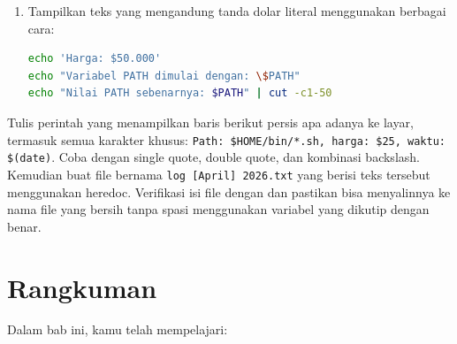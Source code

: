\begin{enumerate}
\begin{lstlisting}[language=bash, caption={Variabel untuk path dengan spasi}]
mkdir -p ~/lab-os/week07-bash/arsip
cp "$FILE_LAMA" "$FILE_BARU"
ls -lah ~/lab-os/week07-bash/arsip/
\end{lstlisting}
    \textit{Amati:} kutipan ganda pada \texttt{"\$FILE\_LAMA"} memastikan
    path yang mengandung spasi diperlakukan sebagai satu argumen, bukan
    dua argumen terpisah.

    \item Tampilkan teks yang mengandung tanda dolar literal menggunakan
          berbagai cara:
\begin{lstlisting}[language=bash, caption={Menampilkan karakter khusus secara literal}]
echo 'Harga: $50.000'
echo "Variabel PATH dimulai dengan: \$PATH"
echo "Nilai PATH sebenarnya: $PATH" | cut -c1-50
\end{lstlisting}
\end{enumerate}

\begin{challengebox}
Tulis perintah  yang menampilkan baris berikut persis apa
adanya ke layar, termasuk semua karakter khusus:
\texttt{Path: \$HOME/bin/*.sh, harga: \$25, waktu: \$(date)}.
Coba dengan single quote, double quote, dan kombinasi backslash. Kemudian
buat file bernama \texttt{log [April] 2026.txt} yang berisi teks tersebut
menggunakan heredoc. Verifikasi isi file dengan  dan pastikan
bisa menyalinnya ke nama file yang bersih tanpa spasi menggunakan
variabel yang dikutip dengan benar.
\end{challengebox}

\section{Rangkuman}
\label{sec:rangkuman-bash-shell}

Dalam bab ini, kamu telah mempelajari:

